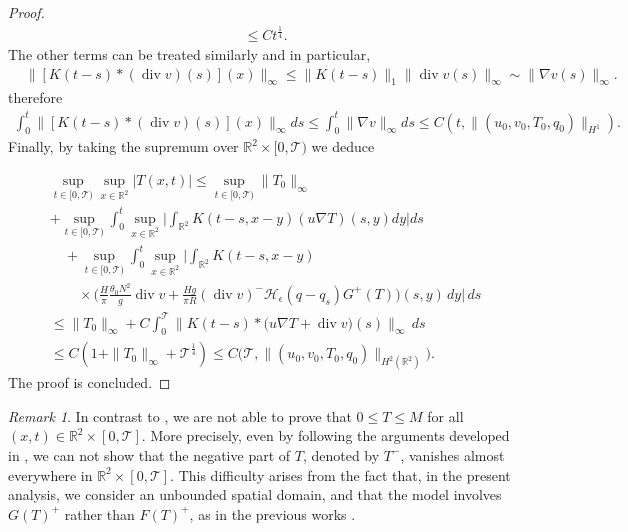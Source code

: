 \documentclass[11pt, a4paper, article,reqno,]{amsart}
\theoremstyle{remark}
\newtheorem{remark}[theorem]{Remark}
\DeclareMathOperator{\dive}{div}
\numberwithin{equation}{section}
\begin{document}
\begin{proof}
\begin{equation*}
\begin{aligned}
     & \leq C t^{\frac{1}{4}}.
\end{aligned}
\end{equation*}
The other terms can be treated similarly and in particular,
\begin{equation*}
    \begin{aligned}
        & \|[K(t-s) * (\dive v)(s)](x)\|_\infty \leq \|K(t-s)\|_{1} \|\dive v (s)\|_\infty \sim \|\nabla v (s)\|_\infty.
    \end{aligned}
\end{equation*}
therefore
\begin{equation*}
    \begin{aligned}
        \int_0^t \|[K(t-s) * (\dive v)(s)](x)\|_\infty ds \leq \int_0^t \|\nabla v\|_\infty ds \leq C(t, \|(u_0,v_0,T_0,q_0)\|_{H^1}).
    \end{aligned}
\end{equation*}
Finally, by taking the supremum over $\mathbb{R}^2 \times [0,\mathcal{T})$ we deduce

\begin{equation*}
\begin{aligned}
& \sup_{t \in [0,\mathcal{T})} \sup_{x \in \mathbb{R}^2} |T(x,t)| 
\leq \sup_{t \in [0,\mathcal{T})} \|T_0\|_{\infty} \\
&+ \sup_{t \in [0,\mathcal{T})} \int_0^t \sup_{x \in \mathbb{R}^2} \Bigg| 
          \int_{\mathbb{R}^2} K(t-s,x-y) ( u \nabla T)(s,y) dy \Bigg|ds\\
& \quad + \sup_{t \in [0,\mathcal{T})} \int_0^t 
      \sup_{x \in \mathbb{R}^2} \Bigg| 
          \int_{\mathbb{R}^2} K(t-s,x-y) \\
& \hspace{2em} \times \Big(\frac{H}{\pi} \frac{\theta_0 N^2}{g} \dive v 
           + \frac{H g}{\pi R} (\dive v)^- \mathcal{H}_\epsilon(q-q_s) G^+(T) \Bigg)(s,y) \, dy 
      \Bigg| \, ds \\
& \leq \|T_0\|_{\infty} 
      +  C \int_0^{\mathcal{T}}
        \Big\| K(t-s) * \Big(u \nabla T + \dive v \Big)(s) \Big\|_{\infty} \, ds \\
& \leq C( 1 + \|T_0\|_{\infty} +  \mathcal{T}^{\frac{1}{4}}) \leq C\Big(\mathcal{T}, \|(u_0,v_0,T_0,q_0)\|_{H^2(\mathbb{R}^2)}\Big).
\end{aligned}
\end{equation*}
The proof is concluded.
\end{proof}
\begin{remark}
In contrast to \cite{CZ}, we are not able to prove that
\( 0 \leq T \leq M \) for all \( (x,t) \in \mathbb{R}^2 \times [0,\mathcal{T}] \). 
More precisely, even by following the arguments developed in \cite{CZ2}, 
we can not show that the negative part of \( T \), denoted by \( T^- \), 
vanishes almost everywhere in \( \mathbb{R}^2 \times [0,\mathcal{T}] \). 
This difficulty arises from the fact that, in the present analysis, we  consider an 
unbounded spatial domain, and that the model involves 
\( G(T)^+ \) rather than \( F(T)^+ \), as in the previous works \cite{CZ, CZ2}.
\end{remark}
\end{document}
